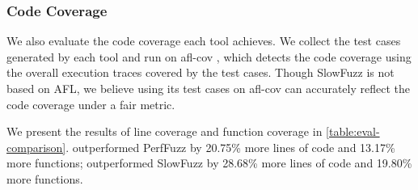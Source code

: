 \subsubsection{Code Coverage}
%
We also evaluate the code coverage each tool achieves.
%
We collect the test cases generated by each tool and run on afl-cov \cite{afl-cov},
%
which detects the code coverage using the overall execution traces covered by the test cases.
%
Though SlowFuzz is not based on AFL, we believe using its test cases on afl-cov can accurately reflect the code coverage under a fair metric.
%

We present the results of line coverage and function coverage in \autoref{table:eval-comparison}.
%
\sys outperformed PerfFuzz by 20.75\% more lines of code and 13.17\% more functions;
%
\sys outperformed SlowFuzz by 28.68\% more lines of code and 19.80\% more functions.
%
